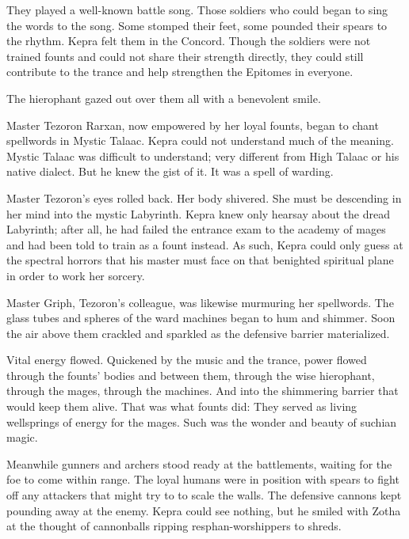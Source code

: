 \documentclass
  [a4paper,
   12pt,
   oneside
  ]%
  {article}
\begin{document}
They played a well-known battle song. 
Those soldiers who could began to sing the words to the song. Some stomped their feet, some pounded their spears to the rhythm. Kepra felt them in the Concord. Though the soldiers were not trained founts and could not share their strength directly, they could still contribute to the trance and help strengthen the Epitomes in everyone.

The hierophant gazed out over them all with a benevolent smile.

Master Tezoron Rarxan, now empowered by her loyal founts, began to chant spellwords in Mystic Talaac. 
Kepra could not understand much of the meaning. Mystic Talaac was difficult to understand; very different from High Talaac or his native dialect.
But he knew the gist of it. It was a spell of warding. 

Master Tezoron’s eyes rolled back. Her body shivered. She must be descending in her mind into the mystic Labyrinth. Kepra knew only hearsay about the dread Labyrinth; after all, he had failed the entrance exam to the academy of mages and had been told to train as a fount instead. 
As such, Kepra could only guess at the spectral horrors that his master must face on that benighted spiritual plane in order to work her sorcery. 

Master Griph, Tezoron's colleague, was likewise murmuring her spellwords. 
The glass tubes and spheres of the ward machines began to hum and shimmer. Soon the air above them crackled and sparkled as the defensive barrier materialized.

Vital energy flowed. 
Quickened by the music and the trance, power flowed through the founts' bodies and between them, through the wise hierophant, through the mages, through the machines. And into the shimmering barrier that would keep them alive. 
That was what founts did: They served as living wellsprings of energy for the mages.
Such was the wonder and beauty of suchian magic.

Meanwhile gunners and archers stood ready at the battlements, waiting for the foe to come within range. 
The loyal humans were in position with spears to fight off any attackers that might try to to scale the walls. 
The defensive cannons kept pounding away at the enemy. Kepra could see nothing, but he smiled with Zotha at the thought of cannonballs ripping resphan-worshippers to shreds.

\end{document}
